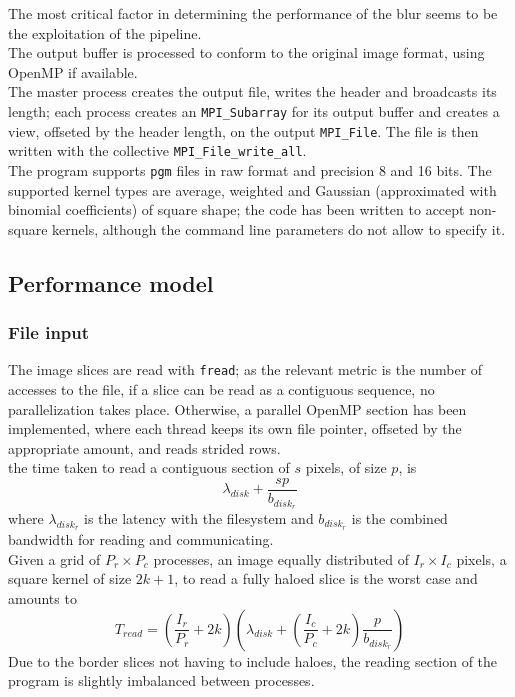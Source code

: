\documentclass[a4paper, 11pt]{article}
\begin{document}
The most critical factor in determining the performance of the blur seems to be the exploitation of the pipeline.\\ 
The output buffer is processed to conform to the original image format, using OpenMP if available.\\
The master process creates the output file, writes the header and broadcasts its length; each process creates an \texttt{MPI\_Subarray} for its output buffer and creates a view, offseted by the header length, on the output \texttt{MPI\_File}. The file is then written with the collective \texttt{MPI\_File\_write\_all}.\\
The program supports \texttt{pgm} files in raw format and precision 8 and 16 bits. The supported kernel types are average, weighted and Gaussian (approximated with binomial coefficients) of square shape; the code has been written to accept non-square kernels, although the command line parameters do not allow to specify it.\\

\subsection{Performance model}
\subsubsection{File input}
The image slices are read with \texttt{fread}; as the relevant metric is the number of accesses to the file, if a slice can be read as a contiguous sequence, no parallelization takes place. Otherwise, a parallel OpenMP section has been implemented, where each thread keeps its own file pointer, offseted by the appropriate amount, and reads strided rows.\\
the time taken to read a contiguous section of $s$ pixels, of size $p$, is
$$\lambda_{disk} + \frac{s p}{b_{disk_r}}$$
where $\lambda_{disk_r}$ is the latency with the filesystem and $b_{disk_r}$ is the combined bandwidth for reading and communicating.\\
Given a grid of $P_r \times P_c$ processes, an image equally distributed of $I_r \times I_c$ pixels, a square kernel of size $2k+1$, to read a fully haloed slice is the worst case and amounts to
$$T_{read} = \left( \frac{I_r}{P_r} + 2k \right) \left( \lambda_{disk} + \left( \frac{I_c}{P_c} + 2k \right) \frac{p}{b_{disk_r}}  \right)$$
Due to the border slices not having to include haloes, the reading section of the program is slightly imbalanced between processes.
\end{document}
